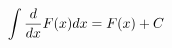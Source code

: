 \documentclass[preview]{standalone}
\begin{document}
\begin{align*}
\special{dvisvgm:raw <g id='unique000'>}\int \frac{d}{dx} F(x) dx = F(x) + C\special{dvisvgm:raw </g>}
\end{align*}
\end{document}
